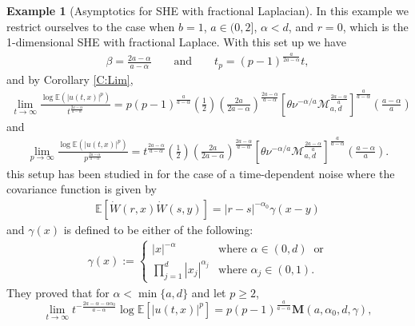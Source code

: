 \documentclass[12pt]{report}
\theoremstyle{plain}
\theoremstyle{definition}
\newtheorem{example}[theorem]{Example}
\numberwithin{equation}{section}
\newcommand{\E}{\mathbb{E}}
\begin{document}
\begin{example}[Asymptotics for SHE with fractional Laplacian] \label{Eg:AsymStable}
	In this example we restrict ourselves to the case when $b=1$, $a\in (0,2]$, $\alpha < d$, and
	$r=0$, which is the 1-dimensional SHE with fractional Laplace. With this set up we have
	\begin{align*}
	\beta = \frac{2a-\alpha}{a-\alpha} \qquad \text{and} \qquad t_p = (p-1)^{\frac{a}{2a-\alpha}} t,
	\end{align*}
	and by Corollary \ref{C:Lim},
	\begin{align} \label{E:AsymStable-t}
	\lim_{t \to \infty} \frac{\log \E\left(|u(t,x)|^p\right)}{t^{\frac{2a-\alpha}{a-\alpha} }} =
	p (p-1)^{\frac{a}{a-\alpha}} \left( \frac{1}{2} \right)\left( \frac{2a}{2a-\alpha} \right)^{\frac{2a-\alpha}{a-\alpha}}
	\left[ \theta \nu^{-\alpha/a} \mathcal{M}_{a,d}^{\frac{2a-\alpha}{a}} \right]^{ \frac{a}{a-\alpha} } \left(\frac{a-\alpha}{a}\right)
	\end{align}
	and
	\begin{align} \label{E:AsymStable-p}
	\lim_{p \to \infty} \frac{\log \E\left(|u(t,x)|^p\right)}{p^{\frac{2a-\alpha}{a-\alpha} }} =
	t^{\frac{2a-\alpha}{a-\alpha}}
	\left( \frac{1}{2} \right)\left( \frac{2a}{2a-\alpha} \right)^{\frac{2a-\alpha}{a-\alpha}}
	\left[ \theta \nu^{-\alpha/a} \mathcal{M}_{a,d}^{\frac{2a-\alpha}{a}} \right]^{ \frac{a}{a-\alpha} } \left(\frac{a-\alpha}{a}\right).
	\end{align}
	this setup has been studied in \cite{chen.hu.ea:18:temporal} for the case of a time-dependent noise where the
	covariance function is given by
	\begin{align*}
	\mathbb{E}[\dot{W}(r,x)\dot{W}(s,y)] = |r-s|^{-\alpha_0}\gamma(x-y)
	\end{align*}
	and $\gamma(x)$ is defined to be either of the following:
	\begin{align} \label{E:gammaHu}
	\gamma(x) := \begin{cases}
	|x|^{-\alpha}                  & \text{where } \alpha \in (0,d)\: \text{ or} \\
	\prod_{j=1}^d |x_j|^{\alpha_j} & \text{where } \alpha_j \in (0,1).
	\end{cases}
	\end{align}
	They proved that for $\alpha < \min\{a,d\}$ and let $p \ge 2$,
	\begin{equation}\label{E:AsymVar}
	\lim_{t\to\infty} t^{-\frac{2a - \alpha - \alpha\alpha_0}{a-\alpha}}\log\mathbb{E}[|u(t,x)|^p]
	= p(p-1)^{\frac{a}{a-\alpha}}\textbf{M}(a,\alpha_0,d,\gamma),

\end{equation}
\end{example}
\end{document}
